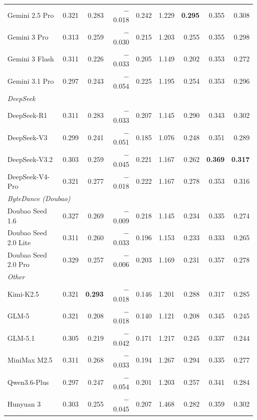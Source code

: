 \begin{table}[!t]
\begin{tabular}{@{}l rrr rr r rr@{}}
Gemini 2.5 Pro & 0.321 & 0.283 & $-$0.018 & \colorbox{secondcell}{0.242} & 1.229 & \colorbox{bestcell}{\textbf{0.295}} & 0.355 & 0.308 \\
Gemini 3 Pro & 0.313 & 0.259 & $-$0.030 & 0.215 & 1.203 & 0.255 & 0.355 & 0.298 \\
Gemini 3 Flash & 0.311 & 0.226 & $-$0.033 & 0.205 & 1.149 & 0.202 & 0.353 & 0.272 \\
Gemini 3.1 Pro & 0.297 & 0.243 & $-$0.054 & 0.225 & 1.195 & 0.254 & 0.353 & 0.296 \\
\midrule
\multicolumn{9}{l}{\textit{DeepSeek}} \\
DeepSeek-R1 & 0.311 & \colorbox{secondcell}{0.283} & $-$0.033 & 0.207 & 1.145 & 0.290 & 0.343 & 0.302 \\
DeepSeek-V3 & 0.299 & 0.241 & $-$0.051 & 0.185 &  \colorbox{secondcell}{1.076}  & 0.248 & 0.351 & 0.289 \\
DeepSeek-V3.2 & 0.303 & 0.259 & $-$0.045 & 0.221 & 1.167 & 0.262 & \colorbox{bestcell}{\textbf{0.369}} & \colorbox{bestcell}{\textbf{0.317}} \\
DeepSeek-V4-Pro & 0.321 & 0.277 & $-$0.018 & 0.222 & 1.167 & 0.278 & 0.353 & \colorbox{secondcell}{0.316} \\
\midrule
\multicolumn{9}{l}{\textit{ByteDance (Doubao)}} \\
Doubao Seed 1.6 & 0.327 & 0.269 & $-$0.009 & 0.218 & 1.145 & 0.234 & 0.335 & 0.274 \\
Doubao Seed 2.0 Lite & 0.311 & 0.260 & $-$0.033 & 0.196 & 1.153 & 0.233 & 0.333 & 0.265 \\
Doubao Seed 2.0 Pro &  \colorbox{secondcell}{0.329} & 0.257 & \colorbox{secondcell}{$-$0.006} & 0.203 & 1.169 & 0.231 & 0.357 & 0.278 \\
\midrule
\multicolumn{9}{l}{\textit{Other}} \\
Kimi-K2.5 & 0.321 & \colorbox{bestcell}{\textbf{0.293}} & $-$0.018 & 0.146 & 1.201 & 0.288 & 0.317 & 0.285 \\
GLM-5 & 0.321 & 0.208 & $-$0.018 & 0.140 & 1.121 & 0.208 & 0.345 & 0.245 \\
GLM-5.1 & 0.305 & 0.219 & $-$0.042 & 0.171 & 1.217 & 0.245 & 0.337 & 0.244 \\
MiniMax M2.5 & 0.311 & 0.268 & $-$0.033 & 0.194 & 1.267 & \colorbox{secondcell}{0.294} & 0.335 & 0.277 \\
Qwen3.6-Plus & 0.297 & 0.247 & $-$0.054 & 0.201 & 1.203 & 0.257 & 0.341 & 0.284 \\
Hunyuan 3 & 0.303 & 0.255 & $-$0.045 & 0.207 & 1.468 & 0.282 & 0.359 & 0.302 \\

\end{tabular}
\end{table}
